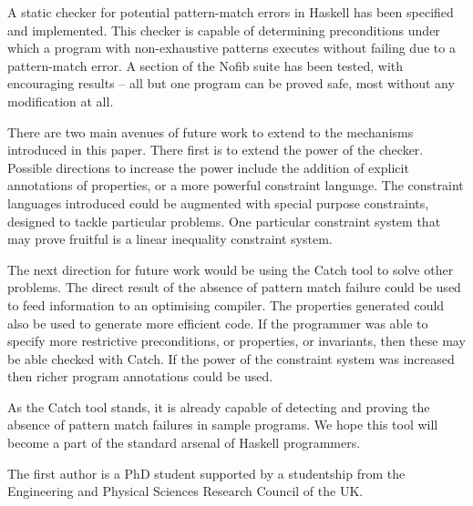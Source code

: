 \documentclass[preprint]{sigplanconf}
\begin{document}
A static checker for potential pattern-match errors in Haskell has been specified and implemented. This checker is capable of determining preconditions under which a program with non-exhaustive patterns executes without failing due to a pattern-match error. A section of the Nofib suite has been tested, with encouraging results -- all but one program can be proved safe, most without any modification at all.

There are two main avenues of future work to extend to the mechanisms introduced in this paper. There first is to extend the power of the checker. Possible directions to increase the power include the addition of explicit annotations of properties, or a more powerful constraint language. The constraint languages introduced could be augmented with special purpose constraints, designed to tackle particular problems. One particular constraint system that may prove fruitful is a linear inequality constraint system.

The next direction for future work would be using the Catch tool to solve other problems. The direct result of the absence of pattern match failure could be used to feed information to an optimising compiler. The properties generated could also be used to generate more efficient code. If the programmer was able to specify more restrictive preconditions, or properties, or invariants, then these may be able checked with Catch. If the power of the constraint system was increased then richer program annotations could be used.

As the Catch tool stands, it is already capable of detecting and proving the absence of pattern match failures in sample programs. We hope this tool will become a part of the standard arsenal of Haskell programmers.


%

\acks

The first author is a PhD student supported by a studentship from the Engineering and Physical Sciences Research Council of the UK.



\end{document}
